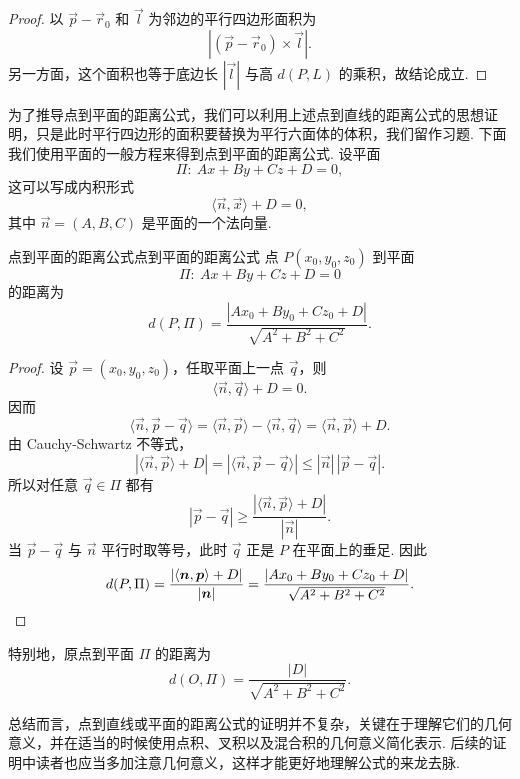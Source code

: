\begin{proof}
    以 $\vec{p} - \vec{r}_0$ 和 $\vec{l}$ 为邻边的平行四边形面积为
    \[
        |(\vec{p} - \vec{r}_0)\times \vec{l}|.
    \]
    另一方面，这个面积也等于底边长 $|\vec{l}|$ 与高 $d(P, L)$ 的乘积，故结论成立.
\end{proof}

为了推导点到平面的距离公式，我们可以利用上述点到直线的距离公式的思想证明，只是此时平行四边形的面积要替换为平行六面体的体积，我们留作习题. 下面我们使用平面的一般方程来得到点到平面的距离公式. 设平面
\[
    \Pi:\ A x + B y + C z + D = 0,
\]
这可以写成内积形式
\[
    \langle \vec{n}, \vec{x} \rangle + D = 0,
\]
其中 $\vec{n} = (A, B, C)$ 是平面的一个法向量.

\begin{theorem}{点到平面的距离公式}{点到平面的距离公式}
    点 $P(x_0, y_0, z_0)$ 到平面
    \[
        \Pi:\ A x + B y + C z + D = 0
    \]
    的距离为
    \[
        d(P, \Pi) = \frac{|A x_0 + B y_0 + C z_0 + D|}{\sqrt{A^2 + B^2 + C^2}}.
    \]
\end{theorem}

\begin{proof}
    设 $\vec{p} = (x_0, y_0, z_0)$，任取平面上一点 $\vec{q}$，则
    \[
        \langle \vec{n}, \vec{q} \rangle + D = 0.
    \]
    因而
    \[
        \langle \vec{n}, \vec{p} - \vec{q} \rangle
        = \langle \vec{n}, \vec{p} \rangle - \langle \vec{n}, \vec{q} \rangle
        = \langle \vec{n}, \vec{p} \rangle + D.
    \]
    由 Cauchy-Schwartz 不等式，
    \[
        |\langle \vec{n}, \vec{p} \rangle + D|
        = |\langle \vec{n}, \vec{p} - \vec{q} \rangle|
        \leqslant |\vec{n}|\,|\vec{p} - \vec{q}|.
    \]
    所以对任意 $\vec{q} \in \Pi$ 都有
    \[
        |\vec{p} - \vec{q}| \geqslant \frac{|\langle \vec{n}, \vec{p} \rangle + D|}{|\vec{n}|}.
    \]
    当 $\vec{p} - \vec{q}$ 与 $\vec{n}$ 平行时取等号，此时 $\vec{q}$ 正是 $P$ 在平面上的垂足. 因此
    \[
        d(P, \Pi)
        = \frac{|\langle \vec{n}, \vec{p} \rangle + D|}{|\vec{n}|}
        = \frac{|A x_0 + B y_0 + C z_0 + D|}{\sqrt{A^2 + B^2 + C^2}}. \qedhere
    \]
\end{proof}

特别地，原点到平面 $\Pi$ 的距离为
\[
    d(O, \Pi) = \frac{|D|}{\sqrt{A^2 + B^2 + C^2}}.
\]

总结而言，点到直线或平面的距离公式的证明并不复杂，关键在于理解它们的几何意义，并在适当的时候使用点积、叉积以及混合积的几何意义简化表示. 后续的证明中读者也应当多加注意几何意义，这样才能更好地理解公式的来龙去脉.

